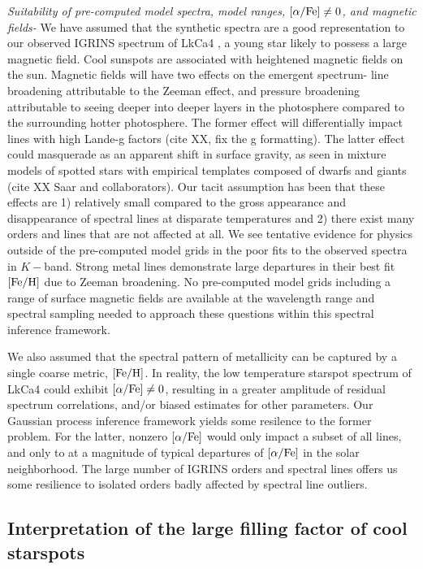 \documentclass[twocolumn]{emulateapj}%
\newcommand{\name}{LkCa4 }
\begin{document}
\emph{Suitability of pre-computed \PHOENIX model spectra, model ranges, $[\alpha/{\rm Fe}] \neq 0$, and magnetic fields-} We have assumed that the \PHOENIX synthetic spectra are a good representation to our observed IGRINS spectrum of \name, a young star likely to possess a large magnetic field.  Cool sunspots are associated with heightened magnetic fields on the sun.  Magnetic fields will have two effects on the emergent spectrum- line broadening attributable to the Zeeman effect, and pressure broadening attributable to seeing deeper into deeper layers in the photosphere compared to the surrounding hotter photosphere.  The former effect will differentially impact lines with high Lande-g factors (cite XX, fix the g formatting).  The latter effect could masquerade as an apparent shift in surface gravity, as seen in mixture models of spotted stars with empirical templates composed of dwarfs and giants (cite XX Saar and collaborators).  Our tacit assumption has been that these effects are 1) relatively small compared to the gross appearance and disappearance of spectral lines at disparate temperatures and 2) there exist many orders and lines that are not affected at all.  We see tentative evidence for physics outside of the pre-computed model grids in the poor fits to the observed spectra in $K-$band.  Strong metal lines demonstrate large departures in their best fit $[{\rm Fe}/{\rm H}]$ due to Zeeman broadening.  No pre-computed model grids including a range of surface magnetic fields are available at the wavelength range and spectral sampling needed to approach these questions within this spectral inference framework.

We also assumed that the spectral pattern of metallicity can be captured by a single coarse metric, $[{\rm Fe}/{\rm H}]$.  In reality, the low temperature starspot spectrum of \name could exhibit $[\alpha/{\rm Fe}] \neq 0$, resulting in a greater amplitude of residual spectrum correlations, and/or biased estimates for other parameters.  Our Gaussian process inference framework yields some resilence to the former problem.  For the latter, nonzero $[\alpha/{\rm Fe}]$ would only impact a subset of all lines, and only to at a magnitude of typical departures of $[\alpha/{\rm Fe}]$ in the solar neighborhood.  The large number of IGRINS orders and spectral lines offers us some resilience to isolated orders badly affected by spectral line outliers.


\subsection{Interpretation of the large filling factor of cool starspots}
\end{document}
